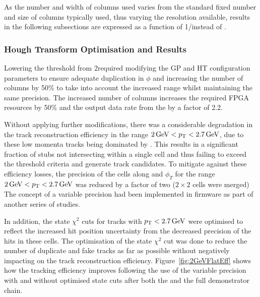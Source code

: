 As the number and width of \qpt \HT columns used varies from the standard fixed number and size of columns typically used, thus varying the \pT resolution available, results in the following subsections are expressed as a function of 1/\pT instead of \pT.

\subsubsection{Hough Transform Optimisation and Results}\label{subsubsec:lowPtOptHT}
Lowering the \pT threshold from 2\GeVc required modifying the GP and HT configuration parameters to ensure adequate duplication in $\phi$ and increasing the number of \qpt columns by 50\% to take into account the increased \pt range whilst maintaining the same precision.
The increased number of \qpt columns increases the required FPGA resources by 50\% and the output data rate from the \HT by a factor of 2.2.

Without applying further modifications, there was a considerable degradation in the track reconstruction efficiency in the range $2\,\text{Ge\hspace{-.08em}V} < p_{\mathrm{T}} < 2.7\,\text{Ge\hspace{-.08em}V}$, due to these low momenta tracks being dominated by \MS.
This results in a significant fraction of stubs not intersecting within a single \HT cell and thus failing to exceed the threshold criteria and generate track candidates.
To mitigate against these efficiency losses, the precision of the \HT cells along \qpt and $\phi_{T}$ for the range $2\,\text{Ge\hspace{-.08em}V} < p_{\mathrm{T}} < 2.7\,\text{Ge\hspace{-.08em}V}$ was reduced by a factor of two (\ie $2 \times 2$ cells were merged)
The concept of a variable precision \HT had been implemented in firmware as part of another series of studies.

In addition, the \KF state $\chi^2$ cuts for tracks with $p_{\mathrm{T}} < 2.7\,\text{Ge\hspace{-.08em}V}$ were optimised to reflect the increased hit position uncertainty from the decreased precision of the hits in these \HT cells.
The optimisation of the \KF state $\chi^2$ cut was done to reduce the number of duplicate and fake tracks as far as possible without negatively impacting on the \HT track reconstruction efficiency.
Figure~\ref{fig:2GeVFlatEff} shows how the tracking efficiency improves following the use of the variable precision \HT with and without optimised \KF state cuts after both the \HT and the full demonstrator chain. 

